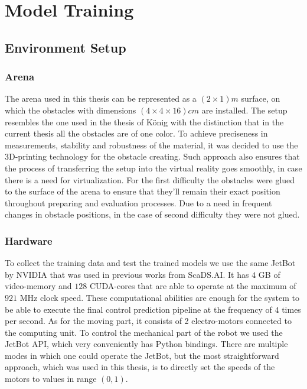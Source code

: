 \chapter{Model Training}
\label{cha:Main}

\section{Environment Setup}

\subsection{Arena}

The arena used in this thesis can be represented as a $(2 \times 1)m$ surface, on which the obstacles with dimensions $(4 \times 4 \times 16) cm$ are installed. The setup resembles the one used in the thesis of König \autocite{konig2022model} with the distinction that in the current thesis all the obstacles are of one color. To achieve preciseness in measurements, stability and robustness of the material, it was decided to use the 3D-printing technology for the obstacle creating. Such approach also ensures that the process of transferring the setup into the virtual reality goes smoothly, in case there is a need for virtualization. For the first difficulty the obstacles were glued to the surface of the arena to ensure that they'll remain their exact position throughout preparing and evaluation processes. Due to a need in frequent changes in obstacle positions, in the case of second difficulty they were not glued.

\subsection{Hardware}

To collect the training data and test the trained models we use the same JetBot by NVIDIA that was used in previous works from ScaDS.AI. It has $4$ GB of video-memory and $128$ CUDA-cores that are able to operate at the maximum of $921$ MHz clock speed. These computational abilities are enough for the system to be able to execute the final control prediction pipeline at the frequency of $4$ times per second. As for the moving part, it consists of 2 electro-motors connected to the computing unit. To control the mechanical part of the robot we used the JetBot API, which very conveniently has Python bindings. There are multiple modes in which one could operate the JetBot, but the most straightforward approach, which was used in this thesis, is to directly set the speeds of the motors to values in range $(0,1)$.

